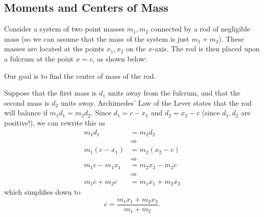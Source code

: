 \documentclass[10pt,]{book}
\numberwithin{equation}{section}
\newcommand{\amp}{&}
\begin{document}
\subsection[{Moments and Centers of Mass}]{Moments and Centers of Mass}\label{subsection-moments-and-centers-of-mass}
\hypertarget{p-688}{}%
Consider a system of two point masses \(m_{1},m_{2}\) connected by a rod of negligible mass (so we can assume that the mass of the system is just \(m_{1}+m_{2}\)). These masses are located at the points \(x_{1},x_{2}\) on the \(x\)-axis. The rod is then placed upon a fulcrum at the point \(x=c\), as shown below:%
\begin{figure}
\centering
{
}
\end{figure}
\hypertarget{p-689}{}%
Our goal is to find the center of mass of the rod.%
\par
\hypertarget{p-690}{}%
Suppose that the first mass is \(d_{1}\) units away from the fulcrum, and that the second mass is \(d_{2}\) units away. Archimedes' Law of the Lever states that the rod will balance if \(m_{1}d_{1} = m_{2}d_{2}\). Since \(d_{1} = c - x_{1}\) and \(d_{2} = x_{2} - c\) (since \(d_{1},d_{2}\) are positive!), we can rewrite this as%
\begin{align*}
m_{1}d_{1} \amp= m_{2}d_{2}\\
\amp\Rightarrow\\
m_{1}(c-x_{1}) \amp= m_{2}(x_{2}-c)\\
\amp\Rightarrow\\
m_{1}c-m_{1}x_{1} \amp= m_{2}x_{2} - m_{2}c\\
\amp\Rightarrow\\
m_{1}c+m_{2}c \amp= m_{1}x_{1}+m_{2}x_{2}
\end{align*}
which simplifies down to%
\begin{equation*}
c = \frac{m_{1}x_{1}+m_{2}x_{2}}{m_{1}+m_{2}}.
\end{equation*}
\end{document}
